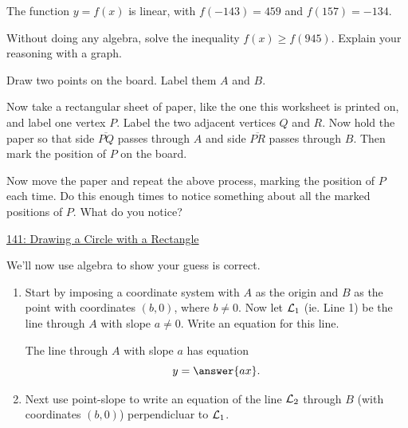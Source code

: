 \documentclass{ximera}
\begin{document}
\begin{question} \label{Qer3r3}
The function $y=f(x)$ is linear, with $f(-143)=459$ and $f(157)=-134$. 

Without doing any algebra, solve the inequality $f(x) \geq f(945)$. Explain your reasoning with a graph.
\end{question}


\begin{question} \label{Q93821L}
Draw two points on the board. Label them $A$ and $B$.

Now take a rectangular sheet of paper, like the one this worksheet is printed on, and label one vertex $P$. Label the two adjacent vertices $Q$ and $R$. Now hold the paper so that side $\overline{PQ}$ passes through $A$ and side $\overline{PR}$ passes through $B$. Then mark the position of $P$ on the board.

Now move the paper and repeat the above process, marking the position of $P$ each time. Do this enough times to notice something about all the marked positions of $P$. What do you notice?
\begin{freeResponse}
\end{freeResponse}


\begin{onlineOnly}
    \begin{center}
\end{center}
\end{onlineOnly}

\href{https://www.desmos.com/calculator/8872fdmjxr}{141: Drawing a Circle with a Rectangle}



We'll now use algebra to show your guess is correct.

\begin{enumerate}
\item Start by imposing a coordinate system with $A$ as the origin and $B$ as the point with coordinates $(b,0)$, where $b\neq 0$. Now let ${\cal L}_1$ (ie. Line 1) be the line through $A$ with slope $a\neq 0$. Write an equation for this line.

The line through $A$ with slope $a$ has equation
\[
    y = \answer{ax}.
\]

\item Next use point-slope to write an equation of the line ${\cal L}_2$ through $B$ (with coordinates $(b,0)$)  perpendicluar to ${\cal L}_1$.


\end{enumerate}
\end{question}
\end{document}
